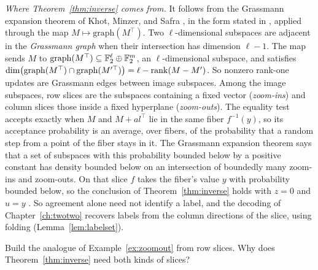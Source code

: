 \emph{Where Theorem~\ref{thm:inverse} comes from.} It follows from the Grassmann expansion theorem of Khot, Minzer, and Safra \cite{KMS23}, in the form stated in \cite[proof of Theorem~5.1]{OAI}, applied through the map $M\mapsto\mathrm{graph}(M^\top)$. Two $\ell$-dimensional subspaces are adjacent in the \emph{Grassmann graph} when their intersection has dimension $\ell-1$. The map sends $M$ to $\mathrm{graph}(M^\top)\subseteq\mathbb{F}_2^\ell\oplus\mathbb{F}_2^m$, an $\ell$-dimensional subspace, and satisfies $\dim\bigl(\mathrm{graph}(M^\top)\cap\mathrm{graph}(M'^\top)\bigr)=\ell-\operatorname{rank}(M-M')$. So nonzero rank-one updates are Grassmann edges between image subspaces. Among the image subspaces, row slices are the subspaces containing a fixed vector (\emph{zoom-ins}) and column slices those inside a fixed hyperplane (\emph{zoom-outs}). The equality test accepts exactly when $M$ and $M+al^\top$ lie in the same fiber $f^{-1}(y)$, so its acceptance probability is an average, over fibers, of the probability that a random step from a point of the fiber stays in it. The Grassmann expansion theorem says that a set of subspaces with this probability bounded below by a positive constant has density bounded below on an intersection of boundedly many zoom-ins and zoom-outs. On that slice $f$ takes the fiber's value $y$ with probability bounded below, so the conclusion of Theorem~\ref{thm:inverse} holds with $z=0$ and $u=y$ \cite[proof of Theorem~5.1]{OAI}. So agreement alone need not identify a label, and the decoding of Chapter~\ref{ch:twotwo} recovers labels from the column directions of the slice, using folding (Lemma~\ref{lem:labelset}).

\chapterquestions
\begin{question}\label{q:rowslices}
Build the analogue of Example~\ref{ex:zoomout} from row slices. Why does Theorem~\ref{thm:inverse} need both kinds of slices?
\end{question}
